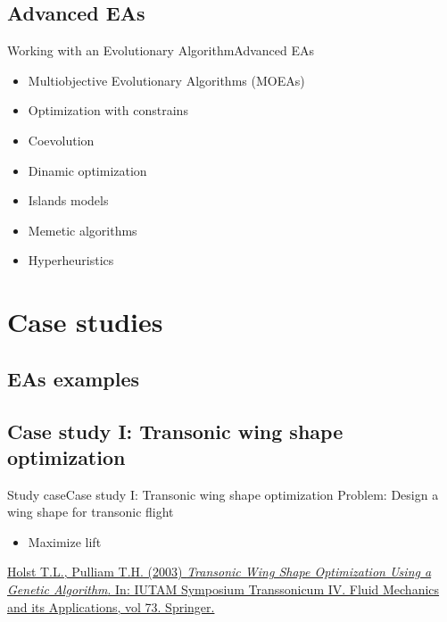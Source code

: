 \documentclass[10pt,compress]{beamer} %
\begin{document}
\subsection{Advanced EAs}
\begin{frame}{Working with an Evolutionary Algorithm}{Advanced EAs}
	\begin{itemize}
	\item Multiobjective Evolutionary Algorithms (MOEAs)
	\item Optimization with constrains
	\item Coevolution
	\item Dinamic optimization
	\item Islands models
	\item Memetic algorithms
	\item Hyperheuristics
	\end{itemize}
\end{frame}

\section{Case studies}

\subsection{EAs examples}

\subsection{Case study I: Transonic wing shape optimization}
\begin{frame}{Study case}{Case study I: Transonic wing shape optimization}
    Problem: Design a wing shape for transonic flight
        \begin{itemize}
        \item Maximize lift
        \end{itemize}

    \setlength{\fboxrule}{0pt}
    \centering {} 
    
    \small
    \begin{flushleft}
    \href{https://link.springer.com/chapter/10.1007/978-94-010-0017-8\_38\#citeas}{Holst T.L., Pulliam T.H. (2003) \textit{Transonic Wing Shape Optimization Using a Genetic Algorithm}. In: IUTAM Symposium Transsonicum IV. Fluid Mechanics and its Applications, vol 73. Springer.}
    \end{flushleft}
\end{frame}
\end{document}
